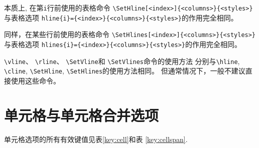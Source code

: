 \documentclass[oneside]{book}
\begin{document}
本质上, 在第\verb!i!行前使用的表格命令 \verb!\SetHline[<index>]{<columns>}{<styles>}!
与表格选项 \verb!hline{i}={<index>}{<columns>}{<styles>}!的作用完全相同。

同样，在某些行前使用的表格命令 \verb!\SetHlines[<index>]{<columns>}{<styles>}!
与表格选项 \verb!hlines{i}={<index>}{<columns>}{<styles>}!的作用完全相同。

\verb!\vline!、 \verb!\rline!、 \verb!\SetVline!和 \verb!\SetVlines!命令的使用方法
分别与\verb!\hline!, \verb!\cline!, \verb!\SetHline!, \verb!\SetHlines!的使用方法相同。
但通常情况下，一般不建议直接使用这些命令。

\section{单元格与单元格合并选项}

单元格选项的所有有效键值见表\ref{key:cell}和表 \ref{key:cellspan}.
\end{document}
